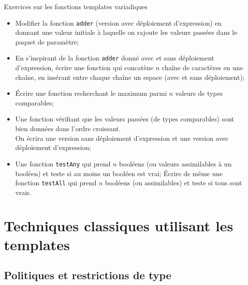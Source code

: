 \documentclass[compress,10pt,aspectratio=169]{beamer}
\begin{document}
\begin{frame}[fragile]{Exercices sur les fonctions templates variadiques}
  \scriptsize
  \begin{itemize}
  \item Modifier la fonction \texttt{adder} (version avec déploiement d'expression)
        en donnant une valeur initiale à laquelle on rajoute les valeurs passées dans 
        le paquet de paramètre; 
  \item En s'inspirant de la fonction \texttt{adder} donné avec et sans déploiement d'expression,
        écrire une fonction qui concatène $n$ chaîne de caractères en une chaîne, en insérant 
        entre chaque chaîne un espace (avec et sans déploiement);
  \item \'Ecrire une fonction recherchant le maximum parmi $n$ valeurs de types comparables;
  \item Une fonction vérifiant que les valeurs passées (de types comparables) sont bien
        données dans l'ordre croissant. \\
        On écrira une version sans déploiement d'expression et une version avec
        déploiement d'expression;
  \item Une fonction \texttt{testAny} qui prend $n$ booléens (ou valeurs assimilables
  à un booléen) et teste si au moins un booléen est vrai; \'Ecrire de même une fonction
  \texttt{testAll} qui prend $n$ booléens (ou assimilables) et teste si tous sont vrais.
  \end{itemize}
  \end{frame}

\section{Techniques classiques utilisant les templates}

\subsection{Politiques et restrictions de type}
\end{document}
